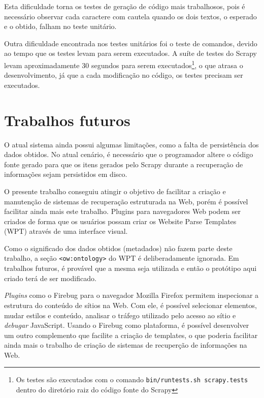 Esta dificuldade torna os testes de geração de código mais trabalhosos, pois é necessário observar cada caractere com cautela quando os dois textos, o esperado e o obtido, falham no teste unitário.

Outra dificuldade encontrada nos testes unitários foi o teste de comandos, devido ao tempo que os testes levam para serem executados. A suíte de testes do Scrapy levam aproximadamente 30 segundos para serem executados\footnote{Os testes são executados com o comando \texttt{bin/runtests.sh scrapy.tests} dentro do diretório raiz do código fonte do Scrapy }, o que atrasa o desenvolvimento, já que a cada modificação no código, os testes precisam ser executados.
\vfill

\pagebreak
\section{Trabalhos futuros}

O atual sistema ainda possui algumas limitações, como a falta de persistência dos dados obtidos. No atual cenário, é necessário que o programador altere o código fonte gerado para que os itens gerados pelo Scrapy durante a recuperação de informações sejam persistidos em disco.

O presente trabalho conseguiu atingir o objetivo de facilitar a criação e manutenção de sistemas de recuperação estruturada na Web, porém é possível facilitar ainda mais este trabalho. Plugins para navegadores Web podem ser criados de forma que os usuários possam criar os Website Parse Templates (WPT) através de uma interface visual.

Como o significado dos dados obtidos (metadados) não fazem parte deste trabalho, a seção \texttt{<ow:ontology>} do WPT é deliberadamente ignorada. Em trabalhos futuros, é provável que a mesma seja utilizada e então o protótipo aqui criado terá de ser modificado. 

\emph{Plugins} como o Firebug \cite{firebug} para o navegador Mozilla Firefox permitem inspecionar a estrutura do conteúdo de sítios na Web. Com ele, é possível selecionar elementos, mudar estilos e conteúdo, analisar o tráfego utilizado pelo acesso ao sítio e \emph{debugar} JavaScript. Usando o Firebug como plataforma, é possível desenvolver um outro complemento que facilite a criação de templates, o que poderia facilitar ainda mais o trabalho de criação de sistemas de recuperção de informações na Web.
